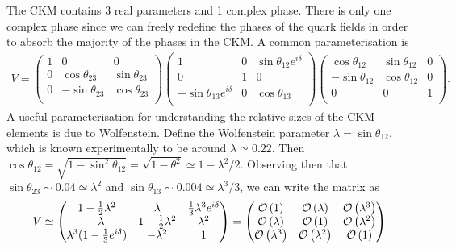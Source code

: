 
The CKM contains 3 real parameters and 1 complex phase. There is only one complex phase since we can freely redefine the phases of the quark fields in order to absorb the majority of the phases in the CKM. A common parameterisation is
\begin{align}
  V =
  \begin{pmatrix}
    1 & 0 & 0 \\
    0 & \cos\theta_{23} & \sin\theta_{23} \\
    0 & -\sin\theta_{23} & \cos\theta_{23} \\
  \end{pmatrix}
  \begin{pmatrix}
    1 & 0 & \sin\theta_{12}e^{i\delta} \\
    0 & 1 & 0  \\
    -\sin\theta_{13} e^{i\delta} & 0 & \cos\theta_{13} \\
  \end{pmatrix}
  \begin{pmatrix}
    \cos\theta_{12} & \sin\theta_{12} & 0  \\
    -\sin\theta_{12} & \cos\theta_{12} & 0 \\
    0 & 0 & 1 \\
  \end{pmatrix}.
\end{align}
A useful parameterisation for understanding the relative sizes of the CKM elements is due to Wolfenstein. Define the Wolfenstein parameter $\lambda = \sin\theta_{12}$, which is known experimentally to be around $\lambda\simeq 0.22$. Then $\cos\theta_{12} = \sqrt{1-\sin^2\theta_{12}} = \sqrt{1-\theta^2} \simeq 1 - \lambda^2/2$. Observing then that $\sin\theta_{23} \sim 0.04 \simeq \lambda^2$ and $\sin\theta_{13} \sim 0.004 \simeq \lambda^3/3$, we can write the matrix as
\begin{align}
  V \simeq
  \begin{pmatrix}
    1 - {1\over 2}\lambda^2 & \lambda & {1\over 3} \lambda^3 e^{i\delta}  \\
    - \lambda & 1 - {1\over 2}\lambda^2 & \lambda^2 \\
    \lambda^3(1-{1\over3} e^{i\delta}) & -\lambda^2 & 1 \\
  \end{pmatrix}
  =
  \begin{pmatrix}
    \mathcal{O}\left( 1 \right) & \mathcal{O}\left( \lambda \right) & \mathcal{O}\left( \lambda^3 \right)  \\
    \mathcal{O}\left( \lambda \right) & \mathcal{O}\left( 1 \right) & \mathcal{O}\left( \lambda^2 \right) \\
    \mathcal{O}\left( \lambda^3 \right) & \mathcal{O}\left( \lambda^2 \right) & \mathcal{O}\left( 1 \right) \\
  \end{pmatrix}
\end{align}
